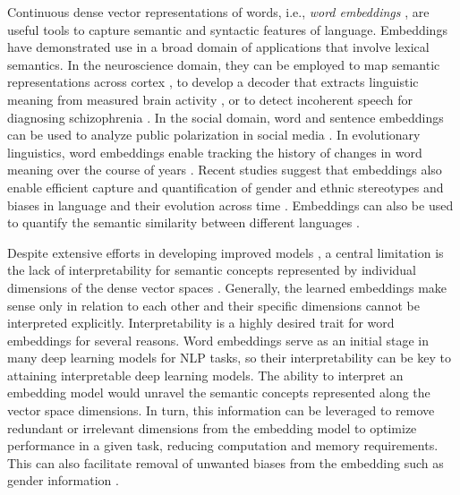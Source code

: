 \documentclass[11pt,a4paper]{article}
\begin{document}
Continuous dense vector representations of words, i.e., \emph{word embeddings} \citep{mikolov13word2vec_a,mikolov13word2vec_b,pennington14glove,bojanowski2017enriching}, are useful tools to capture semantic and syntactic features of language. 
Embeddings have demonstrated use in a broad domain of applications that involve lexical semantics. In the neuroscience domain, they can be employed to map semantic representations across cortex \citep{ruan16brainActivity,huth16semanticMaps}, to develop a decoder that extracts linguistic meaning from measured brain activity \citep{pereira18universalDecoder}, or to detect incoherent speech for diagnosing schizophrenia \citep{iter2018automatic}. In the social domain, word and sentence embeddings can be used to analyze public polarization in social media \citep{demszky19analyzing}. In evolutionary linguistics, word embeddings enable tracking the history of changes in word meaning over the course of years \citep{hamilton16diachronic}. Recent studies suggest that embeddings also enable efficient capture and quantification of gender and ethnic stereotypes and biases in language \citep{bolukbasi16debiasing,garg18gender100years,caliskan17humanLikeBiases} and their evolution across time \citep{agarwal2019word}. Embeddings can also be used to quantify the semantic similarity between different languages \citep{senel17crossLingual,senel18atlas}.

Despite extensive efforts in developing improved models \citep{yu2017refining, celikyilmaz15enriching, yu14improving, liu15learning, mrksic16counterFitting, bollegala16joint, yang16fineTuning}, a central limitation is the lack of interpretability for semantic concepts represented by individual dimensions of the dense vector spaces \citep{chen16InfoGAN,levy14dependency}. Generally, the learned embeddings make sense only in relation to each other and their specific dimensions cannot be interpreted explicitly. Interpretability is a highly desired trait for word embeddings for several reasons. Word embeddings serve as an initial stage in many deep learning models for NLP tasks, so their interpretability can be key to attaining interpretable deep learning models. The ability to interpret an embedding model would unravel the semantic concepts represented along the vector space dimensions. In turn, this information can be leveraged to remove redundant or irrelevant dimensions from the embedding model to optimize performance in a given task, reducing computation and memory requirements. This can also facilitate removal of unwanted biases from the embedding such as gender information \citep{dufter19ultraDense}. 
\end{document}
